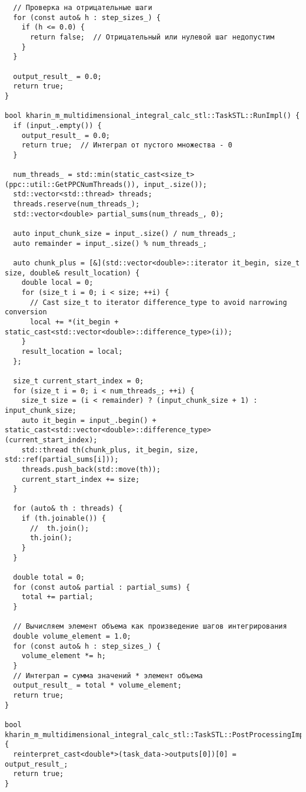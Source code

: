 \documentclass[12pt]{article}
\begin{document}
\begin{lstlisting}
  // Проверка на отрицательные шаги
  for (const auto& h : step_sizes_) {
    if (h <= 0.0) {
      return false;  // Отрицательный или нулевой шаг недопустим
    }
  }

  output_result_ = 0.0;
  return true;
}

bool kharin_m_multidimensional_integral_calc_stl::TaskSTL::RunImpl() {
  if (input_.empty()) {
    output_result_ = 0.0;
    return true;  // Интеграл от пустого множества - 0
  }

  num_threads_ = std::min(static_cast<size_t>(ppc::util::GetPPCNumThreads()), input_.size());
  std::vector<std::thread> threads;
  threads.reserve(num_threads_);
  std::vector<double> partial_sums(num_threads_, 0);

  auto input_chunk_size = input_.size() / num_threads_;
  auto remainder = input_.size() % num_threads_;

  auto chunk_plus = [&](std::vector<double>::iterator it_begin, size_t size, double& result_location) {
    double local = 0;
    for (size_t i = 0; i < size; ++i) {
      // Cast size_t to iterator difference_type to avoid narrowing conversion
      local += *(it_begin + static_cast<std::vector<double>::difference_type>(i));
    }
    result_location = local;
  };

  size_t current_start_index = 0;
  for (size_t i = 0; i < num_threads_; ++i) {
    size_t size = (i < remainder) ? (input_chunk_size + 1) : input_chunk_size;
    auto it_begin = input_.begin() + static_cast<std::vector<double>::difference_type>(current_start_index);
    std::thread th(chunk_plus, it_begin, size, std::ref(partial_sums[i]));
    threads.push_back(std::move(th));
    current_start_index += size;
  }

  for (auto& th : threads) {
    if (th.joinable()) {
      //  th.join();
      th.join();
    }
  }

  double total = 0;
  for (const auto& partial : partial_sums) {
    total += partial;
  }

  // Вычисляем элемент объема как произведение шагов интегрирования
  double volume_element = 1.0;
  for (const auto& h : step_sizes_) {
    volume_element *= h;
  }
  // Интеграл = сумма значений * элемент объема
  output_result_ = total * volume_element;
  return true;
}

bool kharin_m_multidimensional_integral_calc_stl::TaskSTL::PostProcessingImpl() {
  reinterpret_cast<double*>(task_data->outputs[0])[0] = output_result_;
  return true;
}
\end{lstlisting}
\end{document}
